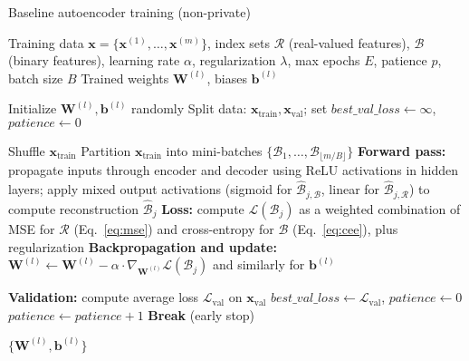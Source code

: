 \begin{algorithm}[!t]
\footnotesize
\caption{Baseline autoencoder training (non-private)} \label{alg:baseline}
\begin{algorithmic}[1]
\REQUIRE Training data $\mathbf{x} = \{\mathbf{x}^{(1)}, \dots, \mathbf{x}^{(m)}\}$, index sets $\mathcal{R}$ (real-valued features), $\mathcal{B}$ (binary features), learning rate $\alpha$, regularization $\lambda$, max epochs $E$, patience $p$, batch size $B$
\ENSURE Trained weights $\mathbf{W}^{(l)}$, biases $\mathbf{b}^{(l)}$

\STATE Initialize $\mathbf{W}^{(l)}, \mathbf{b}^{(l)}$ randomly
\STATE Split data: $\mathbf{x}_{\text{train}}, \mathbf{x}_{\text{val}}$; set $best\_val\_loss \leftarrow \infty$, $patience \leftarrow 0$

    \STATE Shuffle $\mathbf{x}_{\text{train}}$
    \STATE Partition $\mathbf{x}_{\text{train}}$ into mini-batches $\{\mathcal{B}_1, \dots, \mathcal{B}_{\lfloor m/B \rfloor}\}$
        \STATE \textbf{Forward pass:} propagate inputs through encoder and decoder using ReLU activations in hidden layers; apply mixed output activations (sigmoid for $\hat{\mathcal{B}}_{j,\mathcal{B}}$, linear for $\hat{\mathcal{B}}_{j,\mathcal{R}}$) to compute reconstruction $\hat{\mathcal{B}}_j$
        \STATE \textbf{Loss:} compute $\mathcal{L}(\mathcal{B}_j)$ as a weighted combination of MSE for $\mathcal{R}$ (Eq.~\ref{eq:mse}) and cross-entropy for $\mathcal{B}$ (Eq.~\ref{eq:cee}), plus regularization
        \STATE \textbf{Backpropagation and update:} $\mathbf{W}^{(l)} \leftarrow \mathbf{W}^{(l)} - \alpha \cdot \nabla_{\mathbf{W}^{(l)}} \mathcal{L}(\mathcal{B}_j)$ and similarly for $\mathbf{b}^{(l)}$
    \ENDFOR

    \STATE \textbf{Validation:} compute average loss $\mathcal{L}_{\text{val}}$ on $\mathbf{x}_{\text{val}}$
        \STATE $best\_val\_loss \leftarrow \mathcal{L}_{\text{val}}$, $patience \leftarrow 0$
    \ELSE
        \STATE $patience \leftarrow patience + 1$
            \STATE \textbf{Break} (early stop)
        \ENDIF
    \ENDIF
\ENDFOR

\RETURN $\{\mathbf{W}^{(l)}, \mathbf{b}^{(l)}\}$
\end{algorithmic}
\end{algorithm}